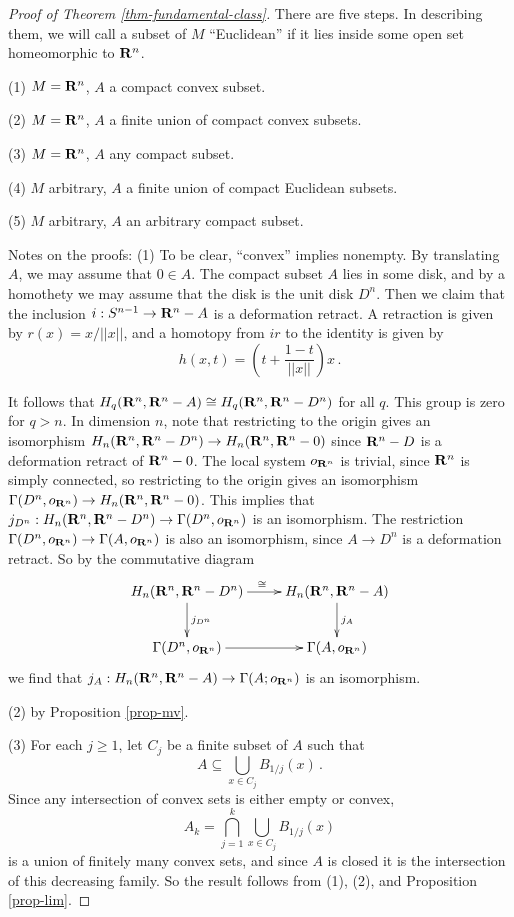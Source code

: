 \begin{proof}[Proof of Theorem \ref{thm-fundamental-class}] 
There are five steps. In describing them, we will call a subset of $M$
``Euclidean'' if it lies inside some open set homeomorphic to $\mathbf R^n$.

\smallskip
\noindent
(1) $M=\mathbf R^n$, $A$ a compact convex subset.

\noindent
(2) $M=\mathbf R^n$, $A$ a finite union of compact convex subsets.

\noindent
(3) $M=\mathbf R^n$, $A$ any compact subset.

\noindent
(4) $M$ arbitrary, $A$ a finite union of compact Euclidean subsets.

\noindent
(5) $M$ arbitrary, $A$ an arbitrary compact subset. 

\smallskip
Notes on the proofs: (1) To be clear, ``convex'' implies nonempty. 
By translating $A$, we may assume that $0\in A$. The compact subset $A$
lies in some disk, and by a homothety we may assume that the disk is the
unit disk $D^n$. Then we claim that the inclusion $i:S^{n-1}\to\mathbf R^n-A$
is a deformation retract. A retraction is given by $r(x)=x/||x||$, 
and a homotopy from $ir$ to the identity is given by 
\[
h(x,t)=\left(t+\frac{1-t}{||x||}\right)x\,.
\]

It follows that $H_q(\mathbf R^n,\mathbf R^n-A)\cong H_q(\mathbf R^n,\mathbf R^n-D^n)$ for all
$q$. This group is zero for $q>n$. In dimension $n$, note that restricting
to the origin gives an isomorphism 
$H_n(\mathbf R^n,\mathbf R^n-D^n)\to H_n(\mathbf R^n,\mathbf R^n-0)$ since 
$\mathbf R^n-D$ is a deformation retract of $\mathbf R^n-0$. The local system $o_{\mathbf R^n}$ 
is trivial, since $\mathbf R^n$ is simply connected, so restricting to the origin
gives an isomorphism $\Gamma(D^n,o_{\mathbf R^n})\to H_n(\mathbf R^n,\mathbf R^n-0)$. 
This implies that $j_{D^n}:H_n(\mathbf R^n,\mathbf R^n-D^n)\to\Gamma(D^n,o_{\mathbf R^n})$
is an isomorphism. The restriction 
$\Gamma(D^n,o_{\mathbf R^n})\to\Gamma(A,o_{\mathbf R^n})$ is also an isomorphism, since
$A\to D^n$ is a deformation retract. So by the commutative diagram
\[
\xymatrix{
H_n(\RR^n,\RR^n-D^n) \ar[r]^\cong \ar[d]^{j_{D^n}} & 
H_n(\RR^n,\RR^n-A) \ar[d]^{j_A} \\
\Gamma(D^n,o_{\RR^n}) \ar[r] & \Gamma(A,o_{\RR^n}) 
}\]
we find that $j_A:H_n(\mathbf R^n,\mathbf R^n-A)\to\Gamma(A;o_{\mathbf R^n})$ is an isomorphism.

(2) by Proposition \ref{prop-mv}. 

(3) For each $j\geq1$, let $C_j$ be a finite subset of $A$ such that 
\[
A\subseteq \bigcup_{x\in C_j}B_{1/j}(x)\,.
\]
Since any intersection of convex sets is either empty or convex, 
\[
A_k=\bigcap_{j=1}^k\bigcup_{x\in C_j}B_{1/j}(x)
\]
is a union of finitely many convex sets, and since $A$ is closed
it is the intersection of this decreasing family. So the result
follows from (1), (2), and Proposition \ref{prop-lim}.


\end{proof}
